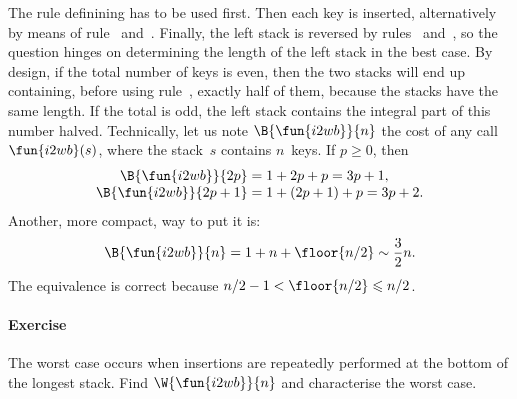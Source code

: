The rule definining  has to be used first. Then each key is
inserted, alternatively by means of rule~\clause{\upsilon}
and~\clause{\psi}. Finally, the left stack is reversed by
rules~\clause{\pi} and~\clause{\rho}, so the question hinges on
determining the length of the left stack in the best case. By design,
if the total number of keys is even, then the two stacks will end up
containing, before using rule~\clause{\rho}, exactly half of them,
because the stacks have the same length. If the total is odd, the left
stack contains the integral part of this number halved. Technically,
let us note \(\B{\fun{i2wb}}{n}\) the cost of any call
\(\fun{i2wb}(s)\), where the stack~\(s\) contains \(n\)~keys. If \(p
\geqslant 0\), then
\begin{equation*}
\begin{array}{@{}r@{\;}c@{\;}l@{}}
\B{\fun{i2wb}}{2p}   & = & 1 +     2p + p = 3p + 1,\\
\B{\fun{i2wb}}{2p+1} & = & 1 + (2p+1) + p = 3p + 2.
\end{array}
\end{equation*}
Another, more compact, way to put it is:
\begin{equation*}
  \B{\fun{i2wb}}{n} = 1 + n + \floor{n/2} \sim \frac{3}{2}{n}.
\end{equation*}
The equivalence is correct because \(n/2-1 < \floor{n/2} \leqslant
n/2\).

\paragraph{Exercise}

The worst case occurs when insertions are repeatedly performed at the
bottom of the longest stack. Find \(\W{\fun{i2wb}}{n}\) and
characterise the worst case.



